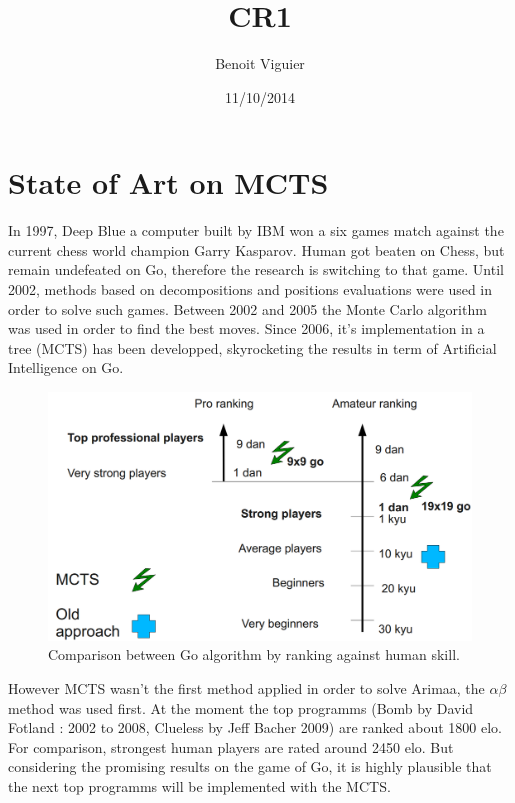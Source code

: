 \documentclass[12pt]{article}
\title{CR1}
\author{Benoit Viguier}
\date{11/10/2014}
\begin{document}
\maketitle
\section{State of Art on MCTS}

In 1997, Deep Blue a computer built by IBM won a six games match against the current chess world champion Garry Kasparov. Human got beaten on Chess, but remain undefeated on Go, therefore the research is switching to that game. Until 2002, methods based on decompositions and positions evaluations were used in order to solve such games. Between 2002 and 2005 the Monte Carlo algorithm was used in order to find the best moves. Since 2006, it's implementation in a tree (MCTS) has been developped, skyrocketing the results in term of Artificial Intelligence on Go.
\begin{figure}[H]
\centering
\includegraphics[width=15cm]{img/ranking.png}
\caption{\label{fig:ranking}Comparison between Go algorithm by ranking against human skill.}
\end{figure}
However MCTS wasn't the first method applied in order to solve Arimaa, the \ensuremath{\alpha\beta} method was used first. At the moment the top programms (Bomb by David Fotland : 2002 to 2008, Clueless by Jeff Bacher 2009) are ranked about 1800 elo. For comparison, strongest human players are rated around 2450 elo. But considering the promising results on the game of Go, it is highly plausible that the next top programms will be implemented with the MCTS.
\end{document}
